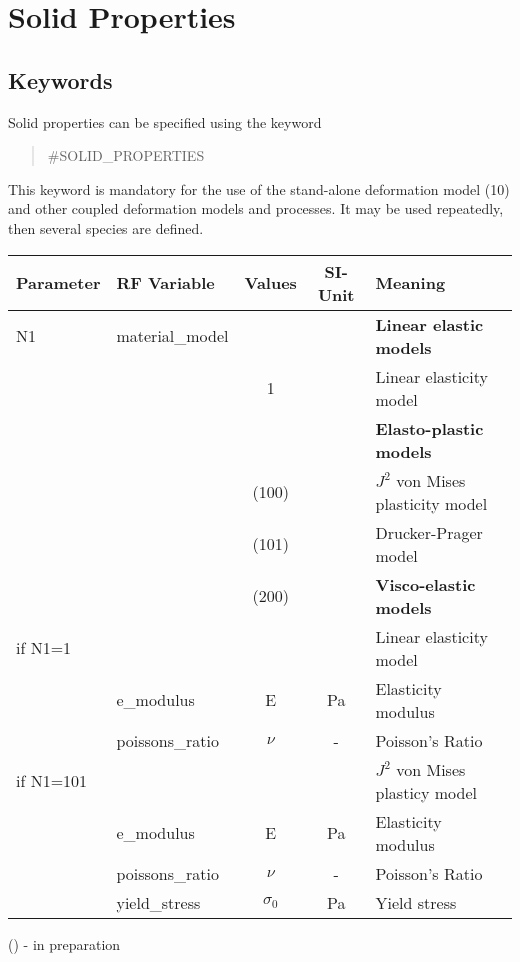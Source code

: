 \section{Solid Properties}

\normalsize



\subsection{Keywords}

Solid properties can be specified using the keyword

\begin{verse}
 \#SOLID\_PROPERTIES
\end{verse}

This keyword is mandatory for the use of the stand-alone deformation model (10) and other coupled
deformation models and processes.  It may be used repeatedly, then several species are defined.

\begin{tabular}{|l|p{2.75cm}|c|c|p{5cm}|}
  \hline
  Parameter &    RF Variable                    &  Values  & SI-Unit & Meaning            \\
  \hline
%
  \hline
%
  N1        & {\footnotesize material\_model}   &          &         & {\bf Linear elastic models}   \\
            &                                   &     1    &         & Linear elasticity model        \\
            &                                   &          &         & {\bf Elasto-plastic models}   \\
            &                                   &   (100)    &         & $J^2$ von Mises plasticity model    \\
            &                                   &   (101)    &         & Drucker-Prager model         \\
            &                                   &   (200)    &         & {\bf Visco-elastic models}     \\
%
  \hline
  \hline
%
  if N1=1   &                                   &          &         & Linear elasticity model        \\
            & {\footnotesize e\_modulus}        &  E       &   Pa    & Elasticity modulus          \\
            & {\footnotesize poissons\_ratio}   &  $\nu$   &   -     & Poisson's Ratio             \\
%
  \hline
  \hline
%
  if N1=101 &                                   &               &         & $J^2$ von Mises plasticy model  \\
            & {\footnotesize e\_modulus}        &  E            &   Pa    & Elasticity modulus          \\
            & {\footnotesize poissons\_ratio}   &  $\nu$        &   -     & Poisson's Ratio             \\
            & {\footnotesize yield\_stress}     &  $\sigma_0$   &   Pa    & Yield stress                \\
%
%
  \hline
%
\end{tabular}
{\footnotesize () - in preparation}


